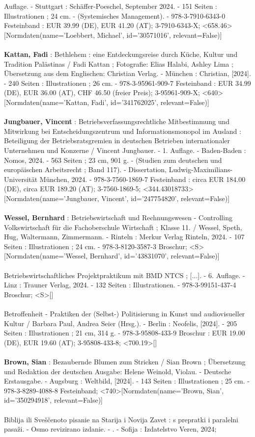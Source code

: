 \documentclass{article}
\begin{document}
\begin{multicols}{3}
Auflage. - Stuttgart : Schäffer-Poeschel, September 2024. - 151 Seiten : Illustrationen ; 24 cm. - (Systemisches Management). - 978-3-7910-6343-0 Festeinband : EUR 39.99 (DE), EUR 41.20 (AT); 3-7910-6343-X; <658.46>[Normdaten(name='Loebbert, Michael', id='30571016', relevant=False)]\\\\\textbf{Kattan, Fadi} : Bethlehem : eine Entdeckungsreise durch Küche, Kultur und Tradition Palästinas / Fadi Kattan ; Fotografie: Elias Halabi, Ashley Lima ; Übersetzung aus dem Englischen: Christian Verlag. - München : Christian, [2024]. - 240 Seiten : Illustrationen ; 26 cm. - 978-3-95961-909-7 Festeinband : EUR 34.99 (DE), EUR 36.00 (AT), CHF 46.50 (freier Preis); 3-95961-909-X; <640>[Normdaten(name='Kattan, Fadi', id='341762025', relevant=False)]\\\\\textbf{Jungbauer, Vincent} : Betriebsverfassungsrechtliche Mitbestimmung und Mitwirkung bei Entscheidungszentrum und Informationsmonopol im Ausland : Beteiligung der Betriebsratsgremien in deutschen Betrieben internationaler Unternehmen und Konzerne / Vincent Jungbauer. - 1. Auflage. - Baden-Baden : Nomos, 2024. - 563 Seiten ; 23 cm, 901 g. - (Studien zum deutschen und europäischen Arbeitsrecht ; Band 117). - Dissertation, Ludwig-Maximilians-Universität München, 2024. - 978-3-7560-1869-7 Festeinband : circa EUR 184.00 (DE), circa EUR 189.20 (AT); 3-7560-1869-5; <344.43018733>[Normdaten(name='Jungbauer, Vincent', id='247754820', relevant=False)]\\\\\textbf{Wessel, Bernhard} : Betriebswirtschaft und Rechnungswesen - Controlling Volkswirtschaft für die Fachoberschule Wirtschaft ; Klasse 11. / Wessel, Speth, Hug, Waltermann, Zimmermann. - Rinteln : Merkur Verlag Rinteln, 2024. - 107 Seiten : Illustrationen ; 24 cm. - 978-3-8120-3587-3 Broschur; <S>[Normdaten(name='Wessel, Bernhard', id='43831070', relevant=False)]\\\\Betriebswirtschaftliches Projektpraktikum mit BMD NTCS ; [...]. - 6. Auflage. - Linz : Trauner Verlag, 2024. - 132 Seiten : Illustrationen. - 978-3-99151-437-4 Broschur; <S>[]\\\\Betroffenheit - Praktiken der (Selbst-) Politisierung in Kunst und audiovisueller Kultur / Barbara Paul, Andrea Seier (Hrsg.). - Berlin : Neofelis, [2024]. - 205 Seiten : Illustrationen ; 21 cm, 314 g. - 978-3-95808-433-9 Broschur : EUR 19.00 (DE), EUR 19.60 (AT); 3-95808-433-8; <700.19>[]\\\\\textbf{Brown, Sian} : Bezaubernde Blumen zum Stricken / Sian Brown ; Übersetzung und Redaktion der deutschen Ausgabe: Helene Weinold, Violau. - Deutsche Erstausgabe. - Augsburg : Weltbild, [2024]. - 143 Seiten : Illustrationen ; 25 cm. - 978-3-8289-4088-8 Festeinband; <740>[Normdaten(name='Brown, Sian', id='350294918', relevant=False)]\\\\Biblija ili Sveščenoto pisanie na Starija i Novija Zavet : s prepratki i paralelni pasaži. - Osmo revizirano izdanie. - . - Sofija : Izdatelstvo Veren, 2024; 
\end{multicols}
\end{document}
